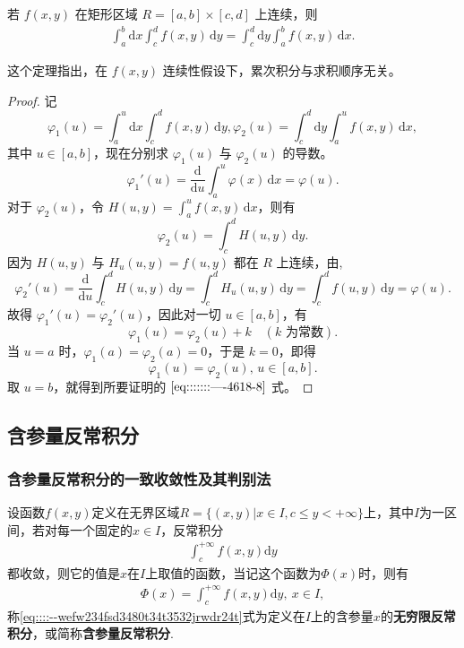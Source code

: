 \documentclass[../../main.tex]{subfiles}%
\begin{document}
\begin{theorem}
若 \( f(x,y) \) 在矩形区域 \( R = [a,b] \times [c,d] \) 上连续，则
\begin{align}
\int_{a}^{b} \mathrm{d}x \int_{c}^{d} f(x,y) \, \mathrm{d}y = \int_{c}^{d} \mathrm{d}y \int_{a}^{b} f(x,y) \, \mathrm{d}x. \label{eq:::::::----4618-8}
\end{align}
\end{theorem}
\begin{note}
这个定理指出，在 \( f(x,y) \) 连续性假设下，累次积分与求积顺序无关。
\end{note}
\begin{proof}

记
\[
\varphi_1(u) = \int_{a}^{u} \mathrm{d}x \int_{c}^{d} f(x,y) \, \mathrm{d}y,
\varphi_2(u) = \int_{c}^{d} \mathrm{d}y \int_{a}^{u} f(x,y) \, \mathrm{d}x,
\]
其中 \( u \in [a,b] \)，现在分别求 \( \varphi_1(u) \) 与 \( \varphi_2(u) \) 的导数。
\[
\varphi_1'(u) = \frac{\mathrm{d}}{\mathrm{d}u} \int_{a}^{u} \varphi(x) \, \mathrm{d}x = \varphi(u).
\]
对于 \( \varphi_2(u) \)，令 \( H(u,y) = \int_{a}^{u} f(x,y) \, \mathrm{d}x \)，则有
\[
\varphi_2(u) = \int_{c}^{d} H(u,y) \, \mathrm{d}y.
\]
因为 \( H(u,y) \) 与 \( H_u(u,y) = f(u,y) \) 都在 \( R \) 上连续，由,
\[
\varphi_2'(u) = \frac{\mathrm{d}}{\mathrm{d}u} \int_{c}^{d} H(u,y) \, \mathrm{d}y = \int_{c}^{d} H_u(u,y) \, \mathrm{d}y
= \int_{c}^{d} f(u,y) \, \mathrm{d}y = \varphi(u).
\]
故得 \( \varphi_1'(u) = \varphi_2'(u) \)，因此对一切 \( u \in [a,b] \)，有
\[
\varphi_1(u) = \varphi_2(u) + k \quad (k \text{ 为常数}).
\]
当 \( u = a \) 时，\( \varphi_1(a) = \varphi_2(a) = 0 \)，于是 \( k = 0 \)，即得
\[
\varphi_1(u) = \varphi_2(u), \, u \in [a,b].
\]
取 \( u = b \)，就得到所要证明的 \(\eqref{eq:::::::----4618-8}\) 式。

\end{proof}




\subsection{含参量反常积分}

\subsubsection{含参量反常积分的一致收敛性及其判别法}

\begin{definition}[含参量反常积分]
设函数$f(x,y)$定义在无界区域$R=\{(x,y)|x\in I,c\leqslant y<+\infty\}$上，其中$I$为一区间，若对每一个固定的$x\in I$，反常积分
\begin{align}
\int_{c}^{+\infty}f(x,y)\mathrm{d}y \label{eq::::--wefw234fsd3480t34t3532jrwdr24t}
\end{align}
都收敛，则它的值是$x$在$I$上取值的函数，当记这个函数为$\varPhi(x)$时，则有
\begin{align}
\varPhi(x)=\int_{c}^{+\infty}f(x,y)\mathrm{d}y,\ x\in I, \label{eq::::--wefw234fsd3480t34t32jrwdr24t}
\end{align}
称\eqref{eq::::--wefw234fsd3480t34t3532jrwdr24t}式为定义在$I$上的含参量$x$的\textbf{无穷限反常积分}，或简称\textbf{含参量反常积分}.
\end{definition}
\end{document}
